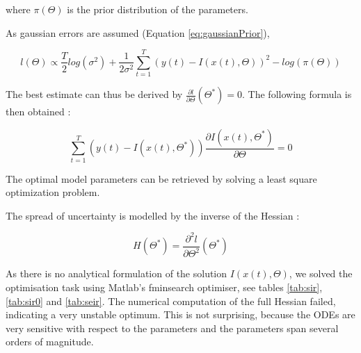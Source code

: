 \documentclass[11pt, a4paper]{article}
\begin{document}
where $\pi(\Theta)$ is the prior distribution of the parameters.

As gaussian errors are assumed (Equation \ref{eq:gaussianPrior}),

\begin{equation}
l(\Theta) \propto \frac{T}{2} log(\sigma^2) + \frac{1}{2 \sigma^2} \sum_{t=1}^T (y(t)-I(x(t), \Theta))^2 - log(\pi(\Theta))
\end{equation}

The best estimate can thus be derived by $\frac{\partial l}{\partial \Theta}(\Theta^*) = 0$. The following formula is then obtained :

\begin{equation}
\sum_{t=1}^T (y(t) - I(x(t), \Theta^*)) \frac{\partial I(x(t), \Theta^*)}{\partial \Theta} = 0
\end{equation}

The optimal model parameters can be retrieved by solving a least square optimization problem. 

The spread of uncertainty is modelled by the inverse of the Hessian :

\begin{equation}
H(\Theta^*) = \frac{\partial^2 l}{\partial \Theta^2} (\Theta^*) 
\end{equation}

As there is no analytical formulation of the solution $I(x(t), \Theta)$, we solved the optimisation task using Matlab's fminsearch optimiser, see tables \ref{tab:sir}, \ref{tab:sir0} and \ref{tab:seir}. The numerical computation of the full Hessian failed, indicating a very unstable optimum. This is not surprising, because the ODEs are very sensitive with respect to the parameters and the parameters span several orders of magnitude.
\end{document}
